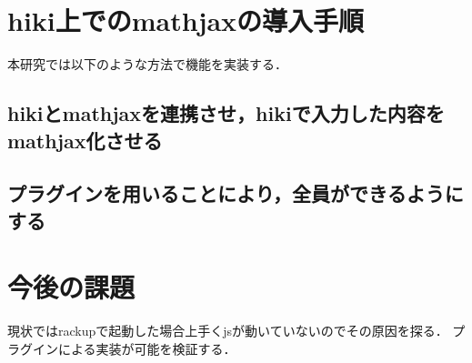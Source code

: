 \documentclass[10pt,a4j,twocolumn]{jsarticle}
\begin{document}
\section{hiki上でのmathjaxの導入手順}
本研究では以下のような方法で機能を実装する．

\subsection{hikiとmathjaxを連携させ，hikiで入力した内容をmathjax化させる}
\subsection{プラグインを用いることにより，全員ができるようにする}
\section{今後の課題}
現状ではrackupで起動した場合上手くjsが動いていないのでその原因を探る．
プラグインによる実装が可能を検証する．
\end{document}

